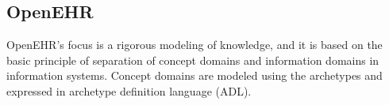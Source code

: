 \subsection{OpenEHR}

OpenEHR's focus is a rigorous modeling of knowledge, and it is based on the basic principle of separation of concept domains and information domains in information systems. Concept domains are modeled using the archetypes and expressed in archetype definition language (ADL).






